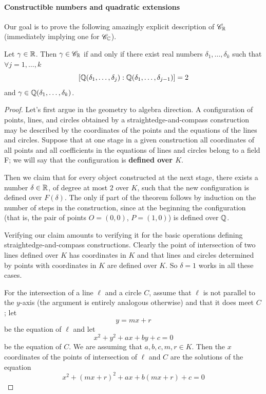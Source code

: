 \paragraph{Constructible numbers and quadratic extensions}
Our goal is to prove the following amazingly explicit description of $\mathscr{C}_{\mathbb{R}}$ (immediately implying one for $\mathscr{C}_{\mathbb{C}}$).
\begin{theorem}\label{constructible number criterion}
Let $\gamma\in\mathbb{R}$. Then $\gamma\in\mathscr{C}_{\mathbb{R}}$ if and only if there exist real numbers $\delta_1,\dots,\delta_k$ such that $\forall j=1,\dots,k$
\[[\mathbb{Q}(\delta_1,\dots,\delta_j):\mathbb{Q}(\delta_1,\dots,\delta_{j-1})]=2\]
and $\gamma\in\mathbb{Q}(\delta_1,\dots,\delta_k)$.
\end{theorem}
\begin{proof}
Let's first argue in the geometry to algebra direction. A configuration of points, lines, and circles obtained by a straightedge-and-compass construction may be described by the coordinates of the points and the equations of the lines
and circles. Suppose that at one stage in a given construction all coordinates of all
points and all coefficients in the equations of lines and circles belong to a field F;
we will say that the configuration is \textbf{defined over $K$}.\par
Then we claim that for every object constructed at the next stage, there exists a number $\delta\in \mathbb{R}$, of degree at most $2$ over $K$, such that the new configuration is defined over $F(\delta)$. The only if part of the theorem follows by induction on the number of steps in the construction, since at the beginning the configuration (that is, the pair of points $O=(0,0)$, $P=(1,0)$) is defined over $\mathbb{Q}$.\par
Verifying our claim amounts to verifying it for the basic operations defining straightedge-and-compass constructions. Clearly the point of intersection of two lines defined over $K$ has coordinates in $K$ and that lines and circles determined by points with coordinates in $K$ are defined over $K$. So $\delta=1$ works in all these cases.\par
For the intersection of a line $\ell$ and a circle $C$, assume that $\ell$ is not parallel to the $y$-axis (the argument is entirely analogous otherwise) and that it does meet $C$; let
\[y=mx+r\]
be the equation of $\ell$ and let
\[x^2+y^2+ax+by+c=0\]
be the equation of $C$. We are assuming that $a,b,c,m,r\in K$. Then the $x$ coordinates of the points of intersection of $\ell$ and $C$ are the solutions of the equation
\[x^2+(mx+r)^2+ax+b(mx+r)+c=0\]

\end{proof}
